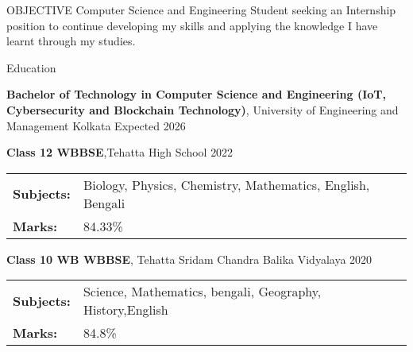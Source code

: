 \documentclass{resume}
\begin{document}
\vspace{-0.4em}
\begin{rSection}{OBJECTIVE}
    {Computer Science and Engineering Student seeking an Internship position to continue developing my skills and applying the knowledge I have learnt through my studies.}

\end{rSection}
\vspace{-0.4em}
\begin{rSection}{Education}

    {\bf Bachelor of Technology in Computer Science and Engineering (IoT, Cybersecurity and Blockchain Technology)}, University of Engineering and Management Kolkata \hfill {Expected 2026}\\
    \vspace{-0.4em}

    {\bf Class 12 WBBSE},Tehatta High School \hfill {2022}\\
    \begin{tabular}{>{\bfseries}l l}
        Subjects: & Biology, Physics, Chemistry, Mathematics, English, Bengali \\
        Marks:    & 84.33\%
    \end{tabular}

    {\bf Class 10 WB WBBSE}, Tehatta Sridam Chandra Balika Vidyalaya \hfill {2020}
    \begin{tabular}{>{\bfseries}l l}
        Subjects: & Science, Mathematics, bengali, Geography, History,English \\
        Marks:    & 84.8\%
    \end{tabular}
\end{rSection}
\vspace{-0.4em}
\end{document}
